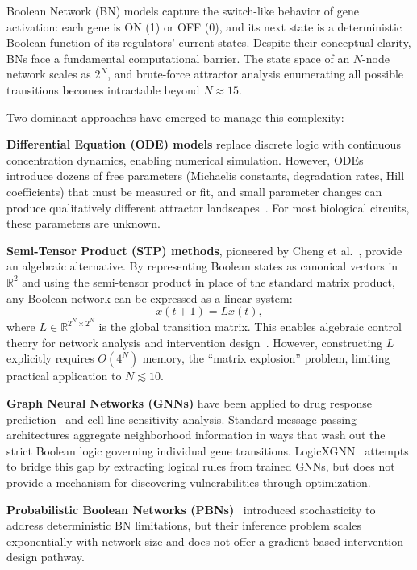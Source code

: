 \documentclass[11pt,a4paper]{article}
\begin{document}
Boolean Network (BN) models capture the switch-like behavior of gene activation: each gene is ON (1) or OFF (0), and its next state is a deterministic Boolean function of its regulators' current states. Despite their conceptual clarity, BNs face a fundamental computational barrier. The state space of an $N$-node network scales as $2^N$, and brute-force attractor analysis enumerating all possible transitions becomes intractable beyond $N \approx 15$.

Two dominant approaches have emerged to manage this complexity:

\textbf{Differential Equation (ODE) models} replace discrete logic with continuous concentration dynamics, enabling numerical simulation. However, ODEs introduce dozens of free parameters (Michaelis constants, degradation rates, Hill coefficients) that must be measured or fit, and small parameter changes can produce qualitatively different attractor landscapes~\cite{aldridge2006physicochemical}. For most biological circuits, these parameters are unknown.

\textbf{Semi-Tensor Product (STP) methods}, pioneered by Cheng et al.~\cite{cheng2011analysis}, provide an algebraic alternative. By representing Boolean states as canonical vectors in $\mathbb{R}^2$ and using the semi-tensor product in place of the standard matrix product, any Boolean network can be expressed as a linear system:
\begin{equation}\label{eq:stp_linear}
x(t+1) = L x(t),
\end{equation}
where $L \in \mathbb{R}^{2^N \times 2^N}$ is the global transition matrix. This enables algebraic control theory for network analysis and intervention design~\cite{cheng2010controllability}. However, constructing $L$ explicitly requires $O(4^N)$ memory, the ``matrix explosion'' problem, limiting practical application to $N \lesssim 10$.

\textbf{Graph Neural Networks (GNNs)} have been applied to drug response prediction~\cite{kipf2017semi} and cell-line sensitivity analysis. Standard message-passing architectures aggregate neighborhood information in ways that wash out the strict Boolean logic governing individual gene transitions. LogicXGNN~\cite{geng2026logicxgnn} attempts to bridge this gap by extracting logical rules from trained GNNs, but does not provide a mechanism for discovering vulnerabilities through optimization.

\textbf{Probabilistic Boolean Networks (PBNs)}~\cite{shmulevich2002probabilistic} introduced stochasticity to address deterministic BN limitations, but their inference problem scales exponentially with network size and does not offer a gradient-based intervention design pathway.
\end{document}
